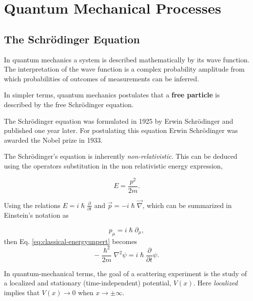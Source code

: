 

\section{Quantum Mechanical Processes} 
\label{scattering-2}

\subsection{The Schr\"odinger Equation}

In quantum mechanics a system is described mathematically by its wave function. The interpretation of the wave function is a complex probability amplitude from which probabilities of outcomes of measurements can be inferred. 

In simpler terms, quantum mechanics postulates that a {\bf free particle} is described by the free Schr\"odinger equation.

The Schr\"odinger equation was formulated in 1925 by Erwin Schr\"odinger and published one year later. For postulating this equation Erwin Schr\"odinger was awarded the Nobel prize in 1933.


The Schr\"odinger's equation is inherently \emph{non-relativistic}. This can be deduced using the operators substitution in the non relativistic energy expression,

    \begin{equation}
        E = \frac{p^2}{2m}.
        \label{eq:classical-energyunpert}
    \end{equation}

Using the relations $E = i\hslash\frac{\partial}{\partial t}$ and $\Vec{p} = -i\hslash\Vec{\nabla}$, which can be summarized in Einstein's notation as

\begin{equation}
\boxed{p_{\mu} = i\hslash \partial_{\mu},}
\end{equation}
then Eq. \eqref{eq:classical-energyunpert} becomes
    \begin{equation}
        -\frac{\hslash^2}{2m}\nabla^2\psi = i\hslash\frac{\partial}{\partial t}\psi.
        \label{eq:schroedinger1unpert}
    \end{equation}

In quantum-mechanical terms, the goal of a scattering experiment is the study of a localized and stationary (time-independent) potential, $V(x)$. Here \emph{localized} implies that $V(x) \rightarrow 0$ when $x \rightarrow \pm \infty$.

